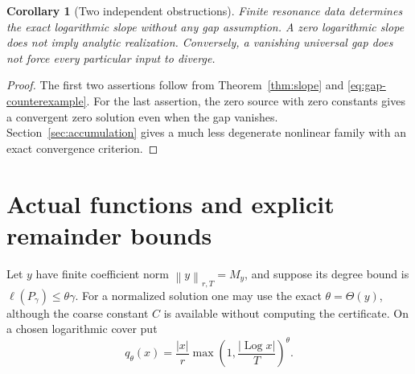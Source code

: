 \documentclass[11pt,a4paper]{article}
\numberwithin{equation}{section}
\newtheorem{corollary}[theorem]{Corollary}
\theoremstyle{definition}
\theoremstyle{remark}
\newcommand{\norm}[1]{\left\lVert #1\right\rVert}
\newcommand{\Log}{\operatorname{Log}}
\begin{document}
\begin{corollary}[Two independent obstructions]\label{cor:independent}
Finite resonance data determines the exact logarithmic slope without
any gap assumption. A zero logarithmic slope does not imply analytic
realization. Conversely, a vanishing universal gap does not force
every particular input to diverge.
\end{corollary}
\begin{proof}
The first two assertions follow from Theorem~\ref{thm:slope} and
\eqref{eq:gap-counterexample}. For the last assertion, the zero source
with zero constants gives a convergent zero solution even when the
gap vanishes. Section~\ref{sec:accumulation} gives a much less
degenerate nonlinear family with an exact convergence criterion.
\end{proof}

\section{Actual functions and explicit remainder bounds}
\label{sec:evaluation}

Let \(y\) have finite coefficient norm \(\norm y_{r,T}=M_y\), and
suppose its degree bound is \(\ell(P_\gamma)\le\theta\gamma\).
For a normalized solution one may use the exact
\(\theta=\Theta(y)\), although the coarse constant \(C\) is available
without computing the certificate. On a chosen logarithmic cover put
\begin{equation}\label{eq:q}
 q_\theta(x)=\frac{|x|}{r}
        \max\left(1,\frac{|\Log x|}{T}\right)^\theta.
\end{equation}
\end{document}

